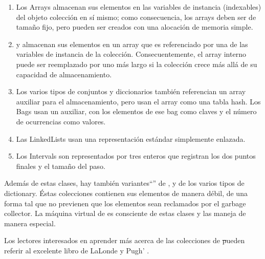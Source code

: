 \documentclass[a4paper,10pt,twoside]{book}
\begin{document}
\begin{enumerate}
  \item Los Arrays almacenan sus elementos en las variables de instancia (indexables) del objeto colecci\'on en s\'i mismo; como consecuencia, los arrays deben ser de tama\~{n}o fijo, pero pueden ser creados con una alocaci\'on de memoria simple.
  \item {} y  almacenan sus elementos en un array que es referenciado por una de las variables de instancia de la colecci\'on.
Consecuentemente, el array interno puede ser reemplazado por uno m\'as largo si la colecci\'on crece m\'as all\'a de su capacidad de almacenamiento.
  \item Los varios tipos de conjuntos y diccionarios tambi\'en referencian un array auxiliar para el almacenamiento, pero usan el array como una tabla hash. Los Bags usan un  auxiliar, con los elementos de ese bag como claves y el n\'umero de ocurrencias como valores.
  \item Las LinkedLists usan una representaci\'on est\'andar simplemente enlazada.
  \item Los Intervals son representados por tres enteros que registran los dos puntos finales y el tama\~{n}o del paso.
\end{enumerate}
Adem\'as de estas clases, hay tambi\'en variantes``'' de ,  y de los varios tipos de dictionary.  \'Estas colecciones contienen sus elementos de manera d\'ebil, \ie de una forma tal que no previenen que los elementos sean reclamados por el garbage collector.
La m\'aquina virtual de \pharo es consciente de estas clases y las maneja de manera especial.

Los lectores interesados en aprender m\'as acerca de las colecciones de \st pueden referir al excelente libro de LaLonde y Pugh' \cite{LaLo90a}.

\end{document}
